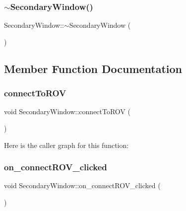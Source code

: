 \subsubsection{\texorpdfstring{$\sim$\+Secondary\+Window()}{~SecondaryWindow()}}
{\footnotesize\ttfamily Secondary\+Window\+::$\sim$\+Secondary\+Window (\begin{DoxyParamCaption}{ }\end{DoxyParamCaption})}



\subsection{Member Function Documentation}
\mbox{\label{class_secondary_window_a1f50424805e3e3545d726e48666ecb14}} 
\subsubsection{\texorpdfstring{connect\+To\+R\+OV}{connectToROV}}
{\footnotesize\ttfamily void Secondary\+Window\+::connect\+To\+R\+OV (\begin{DoxyParamCaption}{ }\end{DoxyParamCaption})\hspace{0.3cm}{\ttfamily [signal]}}

Here is the caller graph for this function\+:
\mbox{\label{class_secondary_window_ac273d33aab31b4a12b7c7688c504f349}} 
\subsubsection{\texorpdfstring{on\+\_\+connect\+R\+O\+V\+\_\+clicked}{on\_connectROV\_clicked}}
{\footnotesize\ttfamily void Secondary\+Window\+::on\+\_\+connect\+R\+O\+V\+\_\+clicked (\begin{DoxyParamCaption}{ }\end{DoxyParamCaption})\hspace{0.3cm}{\ttfamily [slot]}}

